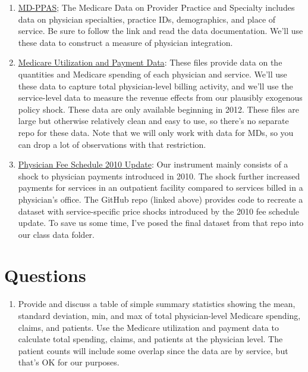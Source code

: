 \documentclass[
  12pt,
]{article}
\providecommand{\tightlist}{%
  \setlength{\itemsep}{0pt}\setlength{\parskip}{0pt}}
\begin{document}
\begin{enumerate}
\def\labelenumi{\arabic{enumi}.}
\item
  \href{https://resdac.org/cms-data/files/md-ppas}{MD-PPAS}; The
  Medicare Data on Provider Practice and Specialty includes data on
  physician specialties, practice IDs, demographics, and place of
  service. Be sure to follow the link and read the data documentation.
  We'll use these data to construct a measure of physician integration.
\item
  \href{https://data.cms.gov/provider-summary-by-type-of-service/medicare-physician-other-practitioners/medicare-physician-other-practitioners-by-provider-and-service}{Medicare
  Utilization and Payment Data}: These files provide data on the
  quantities and Medicare spending of each physician and service. We'll
  use these data to capture total physician-level billing activity, and
  we'll use the service-level data to measure the revenue effects from
  our plausibly exogenous policy shock. These data are only available
  beginning in 2012. These files are large but otherwise relatively
  clean and easy to use, so there's no separate repo for these data.
  Note that we will only work with data for MDs, so you can drop a lot
  of observations with that restriction.
\item
  \href{https://github.com/imccart/PFS_Update_2010}{Physician Fee
  Schedule 2010 Update}: Our instrument mainly consists of a shock to
  physician payments introduced in 2010. The shock further increased
  payments for services in an outpatient facility compared to services
  billed in a physician's office. The GitHub repo (linked above)
  provides code to recreate a dataset with service-specific price shocks
  introduced by the 2010 fee schedule update. To save us some time, I've
  posed the final dataset from that repo into our class data folder.
\end{enumerate}

\hypertarget{questions}{%
\section{Questions}\label{questions}}

\begin{enumerate}
\def\labelenumi{\arabic{enumi}.}
\tightlist
\item
  Provide and discuss a table of simple summary statistics showing the
  mean, standard deviation, min, and max of total physician-level
  Medicare spending, claims, and patients. Use the Medicare utilization
  and payment data to calculate total spending, claims, and patients at
  the physician level. The patient counts will include some overlap
  since the data are by service, but that's OK for our purposes.
\end{enumerate}
\end{document}
